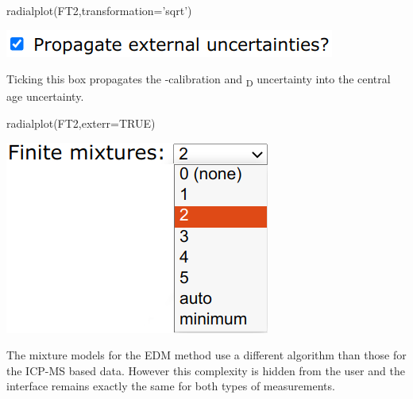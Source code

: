\begin{refsection}
\begin{console}
radialplot(FT2,transformation='sqrt')
\end{console}

\noindent\begin{minipage}[t]{.4\linewidth}
\strut\vspace*{-\baselineskip}\newline
\includegraphics[width=\linewidth]{../figures/ArArExterr.png}
\end{minipage}
\begin{minipage}[t]{.6\linewidth}
  Ticking this box propagates the \textzeta-calibration and
  \textrho\textsubscript{D} uncertainty into the central age
  uncertainty.
\end{minipage}

\begin{console}
radialplot(FT2,exterr=TRUE)
\end{console}

\noindent\begin{minipage}[t]{.3\linewidth}
\strut\vspace*{-\baselineskip}\newline
\includegraphics[width=\linewidth]{../figures/FTmixtures.png}
\end{minipage}
\begin{minipage}[t]{.7\linewidth}
  The mixture models for the EDM method use a different algorithm than
  those for the ICP-MS based data. However this complexity is hidden
  from the user and the interface remains exactly the same for both
  types of measurements.
\end{minipage}


\end{refsection}

